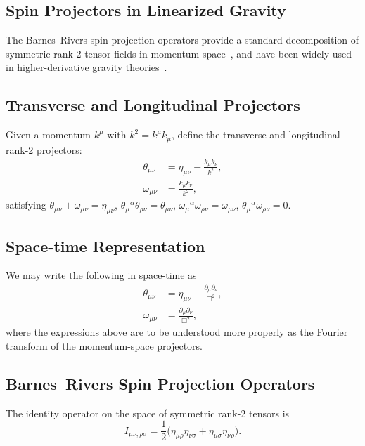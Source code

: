\documentclass[aps,preprintnumbers,superscriptaddress,longbibliography]{revtex4-1}
\begin{document}
\subsection{Spin Projectors in Linearized Gravity}

The Barnes--Rivers spin projection operators provide a standard decomposition of symmetric rank-2 tensor fields in momentum space~\cite{barnes1963thesis,rivers1964lagrangian}, and have been widely used in higher-derivative gravity theories~\cite{van1973ghost,julve1978quantum}.

  \subsection{Transverse and Longitudinal Projectors}

  Given a momentum $k^\mu$ with $k^2 = k^\mu k_\mu$, define the
  transverse and longitudinal rank-2 projectors:
  \begin{align}
      \theta_{\mu\nu} &= \eta_{\mu\nu} - \frac{k_\mu k_\nu}{k^2}, \\
      \omega_{\mu\nu} &= \frac{k_\mu k_\nu}{k^2},
  \end{align}
  satisfying $\theta_{\mu\nu} + \omega_{\mu\nu} = \eta_{\mu\nu}$,\;
  $\theta_{\mu}{}^{\alpha}\theta_{\rho\nu} = \theta_{\mu\nu}$,\;
  $\omega_{\mu}{}^{\alpha}\omega_{\rho\nu} = \omega_{\mu\nu}$,\;
  $\theta_{\mu}{}^{\alpha}\omega_{\rho\nu} = 0$.

\subsection{Space-time Representation}
We may write the following in space-time as 
  \begin{align}
      \theta_{\mu\nu} &= \eta_{\mu\nu} - \frac{\partial_{\mu}\partial_{\nu}}{\Box^2}, \\
      \omega_{\mu\nu} &= \frac{\partial_{\mu}\partial_{\nu}}{\Box^2},
  \end{align}
where the expressions above are to be understood more properly as the Fourier transform of the momentum-space projectors. 


  \subsection{Barnes--Rivers Spin Projection Operators}
  \label{Barnes-Rivers}
The identity operator on the space of symmetric rank-2 tensors is
  \begin{equation}
      I_{\mu\nu,\rho\sigma} = \frac{1}{2}\bigl(\eta_{\mu\rho}\eta_{\nu\sigma}
      + \eta_{\mu\sigma}\eta_{\nu\rho}\bigr).
  \end{equation}
\end{document}
